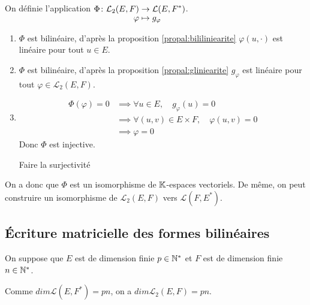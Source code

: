 \documentclass[a4paper, 12pt]{article}
\begin{document}
\begin{demonstration}
    On définie l'application $\funcdef{\Phi}{\mathcal{L}_2(E, F)}{\mathcal{L}(E, F^*)}{\varphi}{g_\varphi}$.

    \begin{enumerate}
        \item $\Phi$ est bilinéaire, d'après la proposition \ref{propal:bililiniearite} $\varphi(u, \cdot)$ est linéaire pour tout $u \in E$.
        \item $\Phi$ est bilinéaire, d'après la proposition \ref{propal:gliniearite} $g_\varphi$ est linéaire pour tout $\varphi \in \mathcal{L}_2(E, F)$.
        
        \item
        \begin{align*}
            \Phi(\varphi) = 0 &\implies \forall u \in E, \quad g_\varphi(u) = 0 \\
            &\implies \forall (u, v) \in E \times F, \quad \varphi(u, v) = 0 \\
            &\implies \varphi = 0
        \end{align*}
        Donc $\Phi$ est injective.
        \begin{hotwarn}
            Faire la surjectivité
        \end{hotwarn}
    \end{enumerate}
    On a donc que $\Phi$ est un isomorphisme de $\mathbb{K}$-espaces vectoriels. De même, on peut construire un isomorphisme de $\mathcal{L}_2(E, F)$ vers $\mathcal{L}(F, E^*)$.
\end{demonstration}

\subsection{Écriture matricielle des formes bilinéaires}

\begin{remarque}
    On suppose que $E$ est de dimension finie $p \in \mathbb{N}^*$ et $F$ est de dimension finie $n \in \mathbb{N}^*$.

    Comme $dim \mathcal{L}(E, F^*) = pn$, on a $dim \mathcal{L}_2(E, F) = pn$.
\end{remarque}
\end{document}
